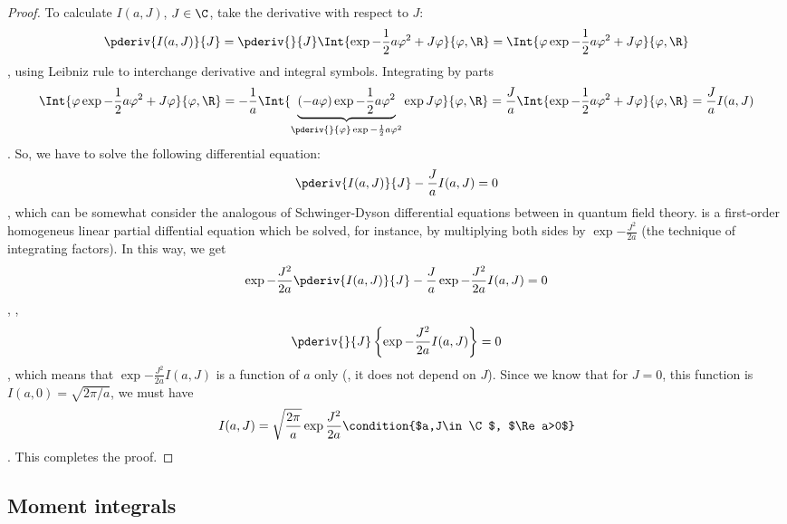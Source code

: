 \begin{proof}
To  calculate $I(a,J)$, $J\in\C$, take the derivative with respect to $J$:
\begin{dmath*}[compact]
   \pderiv{I(a,J)}{J} = \pderiv{}{J}\Int{\exp{-\frac{1}{2} a \varphi^{2} +
	 J\varphi}}{\varphi, \R} 
   = 
   \Int{ \varphi \exp{-\frac{1}{2}a\varphi^{2} + J\varphi}}{\varphi, \R}
\end{dmath*},
using Leibniz rule to interchange derivative and integral symbols.
Integrating by parts 
\begin{dmath*}[compact]
   \Int{ \varphi \exp{-\frac{1}{2}a\varphi^{2} + J\varphi}}{\varphi, \R}
   = -\frac{1}{a} \Int{ \underbrace{\left( -a \varphi \right) \exp{-\frac{1}{2} a
	    \varphi^{2}}}_{\pderiv{}{\varphi} \exp{-\frac{1}{2}a\varphi^{2}}}
      \exp{J\varphi}}{\varphi, \R}
   = \frac{J}{a} \Int{ \exp{-\frac{1}{2} a \varphi^{2} + J\varphi}}{\varphi, \R}
   = \frac{J}{a} I(a, J) 
\end{dmath*}.
So, we have to solve the following differential equation:
\begin{dmath}[label={piSD}]
   \pderiv{I(a,J)}{J} - \frac{J}{a} I(a,J) =0
\end{dmath},
which can be somewhat consider the analogous of Schwinger-Dyson differential
equations between in quantum field theory.
 is a first-order homogeneus linear partial diffential equation which be
solved, for instance, by multiplying both sides by $\exp{-
   \frac{J^{2}}{2a}}$ (the technique of integrating factors).
In this way, we get
\begin{dmath*}
   \exp{-\frac{J^{2}}{2a}} \pderiv{I(a,J)}{J} - \frac{J}{a}
   \exp{-\frac{J^{2}}{2a}} I(a,J) =0 
\end{dmath*},
\ie,
\begin{dmath*}
   \pderiv{}{J} \left\lbrace \exp{-\frac{J^{2}}{2a}} I(a,J) \right\rbrace =0 
\end{dmath*},
which means that $\exp{-\frac{J^{2}}{2a}} I(a,J)$ is a function of $a$ only (\ie, it
does not depend on $J$).
Since we know that for $J=0$, this function is $I(a,0) =
\sqrt{2\pi /a}$,  we must have
\begin{dmath*}
   I(a,J)= \sqrt{\frac{2\pi}{a}} \exp{\frac{J^{2}}{2a}} 
   \condition{$a,J\in\C$, $\Re a>0$}
\end{dmath*}.
This completes the proof.
\end{proof}




\subsection{Moment integrals}
\label{sec:1D moment integrals}

